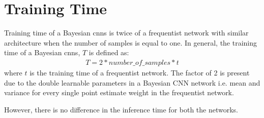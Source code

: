 \section{Training Time}

Training time of a Bayesian \acp{cnn} is twice of a frequentist network with similar architecture when the number of samples is equal to one. In general, the training time of a Bayesian \acp{cnn}, $T$ is defined as:
\begin{align}
T = 2 * number\_of\_samples * t
\end{align}
where $t$ is the training time of a frequentist network. 
The factor of 2 is present due to the double learnable parameters in a Bayesian CNN network i.e. mean and variance for every single point estimate weight in the frequentist network.

However, there is no difference in the inference time for both the networks. 


\ifpdf
    \graphicspath{{Chapter2/Figs/Raster/}{Chapter2/Figs/PDF/}{Chapter2/Figs/}}
\else
    \graphicspath{{Chapter2/Figs/Vector/}{Chapter2/Figs/}}
\fi


